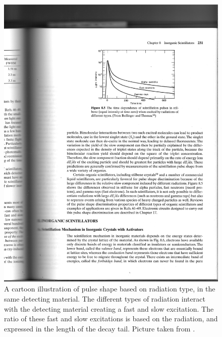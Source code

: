 \begin{figure}
    \centering
    \includegraphics{Setup_Figs/pulse_shape.pdf}
    \caption{A cartoon illustration of pulse shape based on radiation type, in the same detecting material. The different types of radiation interact with the detecting material creating a fast and slow excitation. The ratio of these fast and slow excitations is based on the radiation, and expressed in the length of the decay tail. Picture taken from \citep{knoll00:rad_det_meas}.}
    \label{fig:pulse_discrimination}
\end{figure}